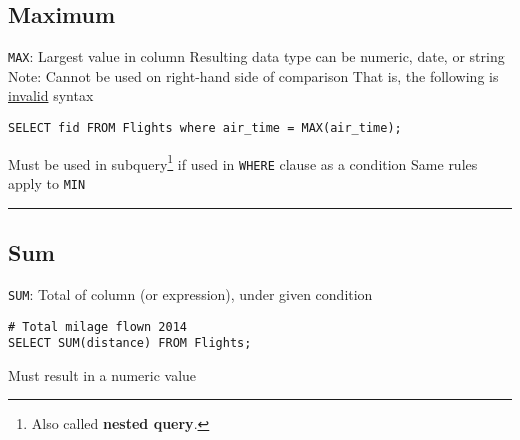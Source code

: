 \documentclass{article}
\begin{document}
  
  
  
  
  
  
  
  
  

\subsection*{Maximum}

\begin{outline}
   \1 \texttt{MAX}: Largest value in column 
        \2 Resulting data type can be numeric, date, or string
        \2 Note: Cannot be used on right-hand side of comparison
                \3 That is,  the following is \underline{invalid} syntax
                
\2[]                       
\begin{lstlisting}[frame=single]  
SELECT fid FROM Flights where air_time = MAX(air_time);
\end{lstlisting} 
   \vspace{-0.5cm}
        \2 Must be used in subquery\footnote{Also called \textbf{nested query}.}
if  used in \texttt{WHERE} clause  as a condition
        \2 Same rules apply to \texttt{MIN}
    
\end{outline}
 
  
  

\hspace{-0.5cm}\rule[-0.101in]{\textwidth}{0.0025in}
    
  
  
  
  
  
  
  












  

\subsection*{Sum}

\begin{outline}

    \1 \texttt{SUM}: Total of column (or expression), under given condition
    
    \begin{lstlisting}[frame=single]
# Total milage flown 2014  
SELECT SUM(distance) FROM Flights;
\end{lstlisting} 
\vspace{-0.5cm}
    \1 Must result in a numeric value 
    
   
\end{outline}
 
\end{document}
